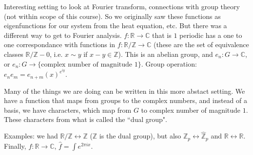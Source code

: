 \documentclass{article}
\theoremstyle{plain}
\theoremstyle{remark}
\newcommand{\Z}{{\mathbb Z}}
\newcommand{\R}{{\mathbb R}}
\newcommand{\C}{{\mathbb C}}
\begin{document}
Interesting setting to look at Fourier transform,
connections with group theory (not within scope of this course).
So we originally saw these functions as eigenfunctions for our system
from the heat equation, etc.
But there was a different way to get to Fourier analysis.
$f \colon \R \to \C$ that is $1$ periodic has a one to one correspondance
with functions in $f \colon \R/ \Z \to \C$
(these are the set of equivalence classes $\R/\Z - 0$,
i.e. $x \sim y$ if $x - y \in \Z$).
This is an abelian group, and $e_n \colon G \to \C$,
or $e_n \colon G \to \{\text{complex number of magnitude }1\}$.
Group operation: $e_ne_m = e_{n+m}(x)^{e^{iy}}$.

Many of the things we are doing can be written in this more abstact setting.
We have a function that maps from groups to the complex numbers,
and instead of a basis, we have characters,
which map from $G$ to complex number of magnitude $1$.
These characters from what is called the ``dual group".

Examples: we had $\R/\Z \leftrightarrow \Z$ ($\Z$ is the dual group),
but also $\Z_p \leftrightarrow \hat{\Z}_p$ and $\R \leftrightarrow \R$.
Finally, $f \colon \R \to \C$, $\hat{f} = \int e^{2 \pi i x}$.
\end{document}
